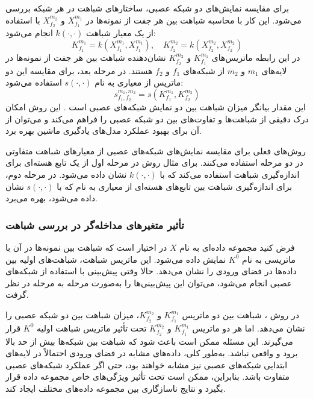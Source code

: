 برای مقایسه نمایش‌های دو شبکه عصبی، ساختارهای شباهت در هر شبکه بررسی می‌شود. این کار با محاسبه شباهت بین هر جفت از نمونه‌ها در \(X^{m_1}_{f_1}\) و \(X^{m_2}_{f_2}\) با استفاده از یک معیار شباهت \( k(\cdot, \cdot) \) انجام می‌شود:
\begin{equation}
	K^{m_1}_{f_1} = k(X^{m_1}_{f_1}, X^{m_1}_{f_1}), \quad K^{m_2}_{f_2} = k(X^{m_2}_{f_2}, X^{m_2}_{f_2})
	\label{eq_dCKA_Kernel}
\end{equation}
در این رابطه ماتریس‌های \(K^{m_1}_{f_1}\) و \(K^{m_2}_{f_2}\) نشان‌دهنده شباهت بین هر جفت از نمونه‌ها در لایه‌های \(m_1\) و \(m_2\) از شبکه‌های \(f_1\) و \(f_2\) هستند. در مرحله بعد، برای مقایسه این دو ماتریس از معیاری به نام \(s(\cdot, \cdot)\) استفاده می‌شود:
\begin{equation}
	s^{m_1,m_2}_{f_1,f_2} = s(K^{m_1}_{f_1}, K^{m_2}_{f_2})
	\label{eq_similarity}
\end{equation}
این مقدار بیانگر میزان شباهت بین دو نمایش شبکه‌های عصبی است
\cite{cui2022deconfounded}.
این روش امکان درک دقیقی از شباهت‌ها و تفاوت‌های بین دو شبکه عصبی را فراهم می‌کند و می‌توان از آن برای بهبود عملکرد مدل‌های یادگیری ماشین بهره برد.

روش‌های فعلی برای مقایسه نمایش‌های شبکه‌های عصبی از معیارهای شباهت متفاوتی در دو مرحله استفاده می‌کنند. برای مثال روش
در مرحله اول از یک تابع هسته‌ای برای اندازه‌گیری شباهت استفاده می‌کند که با \( k(\cdot,\cdot) \) نشان داده می‌شود. در مرحله دوم، برای اندازه‌گیری شباهت بین تابع‌های هسته‌ای از معیاری به نام
که با \( s(\cdot,\cdot) \) نشان داده می‌شود، بهره می‌برد.


\vspace{3mm}
\subsubsection{
	تأثیر متغیرهای مداخله‌گر%
	در بررسی شباهت
}\vspace{-1mm}
فرض کنید مجموعه داده‌ای به نام \(X\) در اختیار است که شباهت بین نمونه‌ها در آن با ماتریسی به نام
\( K^0 \)
نمایش داده می‌شود. این ماتریس شباهت، شباهت‌های اولیه بین داده‌ها در فضای ورودی را نشان می‌دهد. حالا وقتی پیش‌بینی با استفاده از شبکه‌های عصبی انجام می‌شود، می‌توان این پیش‌بینی‌ها را به‌صورت مرحله به مرحله در نظر گرفت.

در روش
%
، شباهت بین دو ماتریس \(K_{f_1}^{m_1}\) و \(K_{f_2}^{m_2}\)، میزان شباهت بین دو شبکه عصبی را نشان می‌دهد. اما هر دو ماتریس \(K_{f_1}^{m_1}\) و \(K_{f_2}^{m_2}\) تحت تأثیر ماتریس شباهت اولیه
\( K^0 \)
قرار می‌گیرند. این مسئله ممکن است باعث شود که شباهت بین شبکه‌ها بیش از حد بالا برود و واقعی نباشد. به‌طور کلی، داده‌های مشابه در فضای ورودی احتمالاً در لایه‌های ابتدایی شبکه‌های عصبی نیز مشابه خواهند بود، حتی اگر عملکرد شبکه‌های عصبی متفاوت باشد. بنابراین،
ممکن است تحت تأثیر ویژگی‌های خاص مجموعه داده قرار بگیرد و نتایج ناسازگاری بین مجموعه داده‌های مختلف ایجاد کند.

